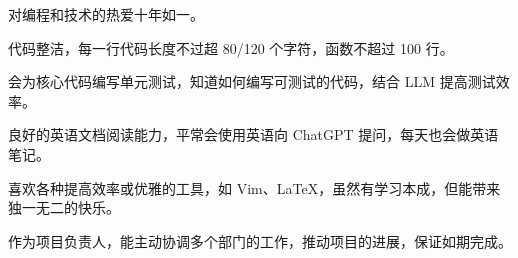 

\begin{cventries}

  \cventry
    {} {} {} {}
    {
      \begin{cvitems}
        \item {对编程和技术的热爱十年如一。}
        \item {代码整洁，每一行代码长度不过超 80/120 个字符，函数不超过 100 行。}
        \item {会为核⼼代码编写单元测试，知道如何编写可测试的代码，结合 LLM 提高测试效率。}
        \item {良好的英语文档阅读能力，平常会使用英语向 ChatGPT 提问，每天也会做英语笔记。}
        \item {喜欢各种提高效率或优雅的工具，如 Vim、LaTeX，虽然有学习本成，但能带来独一无二的快乐。}
        \item {作为项⽬负责⼈，能主动协调多个部门的工作，推动项⽬的进展，保证如期完成。}
      \end{cvitems}
    }

\end{cventries}
